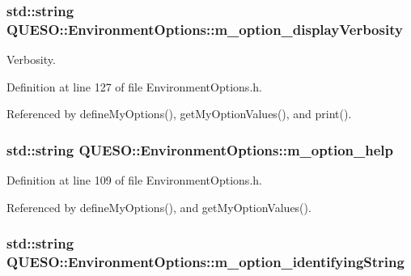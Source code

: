 \hypertarget{class_q_u_e_s_o_1_1_environment_options_a4f89e406c541712444f057a871a9c721}{
\subsubsection[{m\-\_\-option\-\_\-display\-Verbosity}]{\setlength{\rightskip}{0pt plus 5cm}std\-::string Q\-U\-E\-S\-O\-::\-Environment\-Options\-::m\-\_\-option\-\_\-display\-Verbosity\hspace{0.3cm}{\ttfamily [private]}}}\label{class_q_u_e_s_o_1_1_environment_options_a4f89e406c541712444f057a871a9c721}


Verbosity. 



Definition at line 127 of file Environment\-Options.\-h.



Referenced by define\-My\-Options(), get\-My\-Option\-Values(), and print().

\hypertarget{class_q_u_e_s_o_1_1_environment_options_a5db2dbd99ef52563cb42c348ee53ea47}{
\subsubsection[{m\-\_\-option\-\_\-help}]{\setlength{\rightskip}{0pt plus 5cm}std\-::string Q\-U\-E\-S\-O\-::\-Environment\-Options\-::m\-\_\-option\-\_\-help\hspace{0.3cm}{\ttfamily [private]}}}\label{class_q_u_e_s_o_1_1_environment_options_a5db2dbd99ef52563cb42c348ee53ea47}


Definition at line 109 of file Environment\-Options.\-h.



Referenced by define\-My\-Options(), and get\-My\-Option\-Values().

\hypertarget{class_q_u_e_s_o_1_1_environment_options_a20ec38c1f5b7f1b288c7a0151c646e1b}{
\subsubsection[{m\-\_\-option\-\_\-identifying\-String}]{\setlength{\rightskip}{0pt plus 5cm}std\-::string Q\-U\-E\-S\-O\-::\-Environment\-Options\-::m\-\_\-option\-\_\-identifying\-String\hspace{0.3cm}{\ttfamily [private]}}}\label{class_q_u_e_s_o_1_1_environment_options_a20ec38c1f5b7f1b288c7a0151c646e1b}


